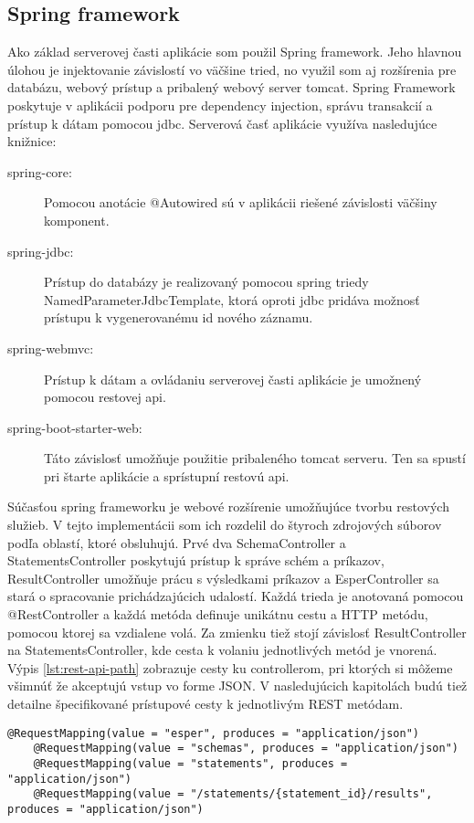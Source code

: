 	\subsection{Spring framework}
		Ako základ serverovej časti aplikácie som použil Spring framework. Jeho hlavnou úlohou je injektovanie závislostí vo väčšine tried, no využil som aj rozšírenia pre databázu, webový prístup a pribalený webový server tomcat.
		Spring Framework poskytuje v aplikácii podporu pre dependency injection, správu transakcií a prístup k dátam pomocou jdbc. Serverová časť aplikácie využíva nasledujúce knižnice:
		\begin{description}
			\item[spring-core:] Pomocou anotácie @Autowired sú v aplikácii riešené závislosti väčšiny komponent.
			\item[spring-jdbc:] Prístup do databázy je realizovaný pomocou spring triedy NamedParameterJdbcTemplate, ktorá oproti jdbc pridáva možnosť prístupu k vygenerovanému id nového záznamu.
			\item[spring-webmvc:] Prístup k dátam a ovládaniu serverovej časti aplikácie je umožnený pomocou restovej api.
			\item[spring-boot-starter-web:] Táto závislosť umožňuje použitie pribaleného tomcat serveru. Ten sa spustí pri štarte aplikácie a sprístupní restovú api.
		\end{description}
		
		Súčasťou spring frameworku je webové rozšírenie umožňujúce tvorbu restových služieb. V tejto implementácii som ich rozdelil do štyroch zdrojových súborov podľa oblastí, ktoré obsluhujú. Prvé dva SchemaController a StatementsController poskytujú prístup k správe schém a príkazov, ResultController umožňuje prácu s výsledkami príkazov a EsperController sa stará o spracovanie prichádzajúcich udalostí. Každá trieda je anotovaná pomocou @RestController a každá metóda definuje unikátnu cestu a HTTP metódu, pomocou ktorej sa vzdialene volá. Za zmienku tiež stojí závislosť ResultController na StatementsController, kde cesta k volaniu jednotlivých metód je vnorená. Výpis \ref{lst:rest-api-path} zobrazuje cesty ku controllerom, pri ktorých si môžeme všimnúť že akceptujú vstup vo forme JSON. V nasledujúcich kapitolách budú tiež detailne špecifikované prístupové cesty k jednotlivým REST metódam.
		
		\begin{lstlisting}[label=lst:rest-api-path,caption=Definícia ciest REST API]
	@RequestMapping(value = "esper", produces = "application/json")
	@RequestMapping(value = "schemas", produces = "application/json")
	@RequestMapping(value = "statements", produces = "application/json")
	@RequestMapping(value = "/statements/{statement_id}/results", produces = "application/json")
		\end{lstlisting}
		
